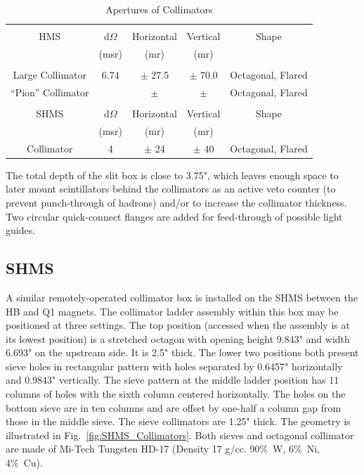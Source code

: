 \begin{table}
\begin{center}
\caption{Apertures of Collimators\label{tab:apertures}}
\begin{tabular}{|c|c|c|c|c|}
\hline
{} & {} & {} & {} & {} \\
HMS & d$\Omega$ & Horizontal & Vertical & Shape \\
{}  & (msr) 	& (mr) 	     & (mr) 	& {} 	\\
{} & {} & {} & {} & {} \\ \hline
Large Collimator  & 6.74 & $\pm$ 27.5 	& $\pm$ 70.0 	& Octagonal, Flared 	\\
``Pion'' Collimator&  	& $\pm$	& $\pm$  	& Octagonal, Flared 	\\
{} & {} & {} & {} & {} \\ \hline
SHMS	& d$\Omega$ 	& Horizontal 	& Vertical 		& Shape 	\\
{} 	& (msr) 	& (mr) 		& (mr) 		& {} 	\\
Collimator &   4         & $\pm$ 24      &  $\pm$ 40     & Octagonal, Flared \\
\hline
\end{tabular}
\end{center}
\end{table}

The total depth of the slit box is close to 3.75", which leaves
enough space to later mount scintillators behind the collimators as an active
veto counter (to prevent punch-through of hadrons) and/or to increase
the collimator thickness. Two circular quick-connect flanges are
added for feed-through of possible light guides.

\subsection{SHMS}
\label{sssec:shms_slit}
A similar remotely-operated collimator box is installed on the SHMS between the
HB and Q1 magnets. The collimator ladder assembly within this box may be positioned
at three settings. The top position (accessed when the assembly is at its lowest
position) is a stretched octagon with opening height 9.843" and width 6.693" on the
upstream side. It is 2.5" thick. The lower two positions both present sieve holes in
rectangular pattern with holes separated by 0.6457" horizontally and 0.9843"
vertically. The sieve pattern at the middle ladder position has 11 columns of holes with
the sixth column centered horizontally. The holes on the bottom sieve are in ten
columns and are offset by one-half a column gap from those in the middle sieve.
The sieve collimators are 1.25" thick. The geometry is illustrated in Fig.~\ref{fig:SHMS_Collimators}.
Both sieves and octagonal collimator are
made of Mi-Tech\texttrademark{} Tungsten HD-17 (Density 17 g/cc. 90\%~W, 6\%~Ni, 4\%~Cu).

